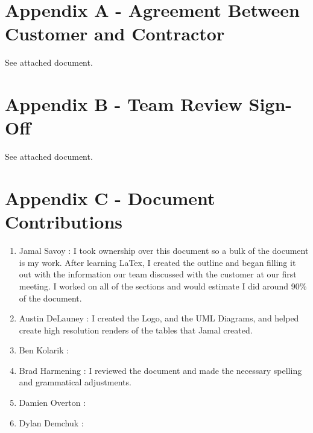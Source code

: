 \documentclass{article}
\begin{document}

\section{Appendix A - Agreement Between Customer and Contractor}\label{sec:apendixA}

\vspace{2.5mm}

\begin{addmargin}[2em]{0em}

See attached document.

\end{addmargin}

\section{Appendix B - Team Review Sign-Off}\label{sec:appendixB}

\vspace{2.5mm}

\begin{addmargin}[2em]{0em}

See attached document.

\end{addmargin}

\section{Appendix C - Document Contributions}\label{sec:appendixC}

\vspace{2.5mm}

\begin{addmargin}[2em]{0em}
\begin{enumerate}

\item Jamal Savoy : I took ownership over this document so a bulk of the document is my work. After learning LaTex, I created the outline and began filling it out with the information our team discussed with the customer at our first meeting. I worked on all of the sections and would estimate I did around 90\% of the document.

\item Austin DeLauney : I created the Logo, and the UML Diagrams, and helped create high resolution renders of the tables that Jamal created.

\item Ben Kolarik : 

\item Brad Harmening : I reviewed the document and made the necessary spelling and grammatical adjustments.

\item Damien Overton : 

\item Dylan Demchuk : 

\end{enumerate}
\end{addmargin}
\end{document}
